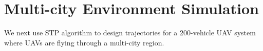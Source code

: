 \section{Multi-city Environment Simulation \label{sec:bayArea_sim}}
We next use STP algorithm to design trajectories for a 200-vehicle UAV system where UAVs are flying through a multi-city region.
